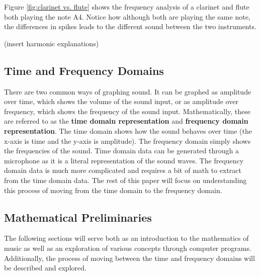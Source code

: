 \documentclass[10pt]{article}
\begin{document}
Figure \ref{fig:clarinet vs. flute} shows the frequency analysis of a clarinet and flute both playing the note A4. Notice how although both are playing the same note, the differences in spikes leads to the different sound between the two instruments. 

\vspace{1cm}(insert harmonic explanations)\vspace{1cm}

\subsection{Time and Frequency Domains}
\hspace{\parindent} There are two common ways of graphing sound. It can be graphed as amplitude over time, which shows the volume of the sound input, or as amplitude over frequency, which shows the frequency of the sound input. Mathematically, these are referred to as the \textbf{time domain representation} and \textbf{frequency domain representation}. The time domain shows how the sound behaves over time (the x-axis is time and the y-axis is amplitude). The frequency domain simply shows the frequencies of the sound. Time domain data can be generated through a microphone as it is a literal representation of the sound waves. The frequency domain data is much more complicated and requires a bit of math to extract from the time domain data. The rest of this paper will focus on understanding this process of moving from the time domain to the frequency domain.



\subsection{Mathematical Preliminaries}
The following sections will serve both as an introduction to the mathematics of music as well as an exploration of various concepts through computer programs. Additionally, the process of moving between the time and frequency domains will be described and explored.

\end{document}
